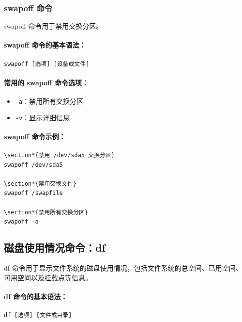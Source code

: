 \documentclass[12pt,UTF8]{ctexbook}
\begin{document}
\subsubsection{swapoff 命令}
swapoff 命令用于禁用交换分区。

\paragraph{swapoff 命令的基本语法：}
\begin{verbatim}
swapoff [选项] [设备或文件]
\end{verbatim}

\paragraph{常用的 swapoff 命令选项：}
\begin{itemize}
    \item \verb+-a+：禁用所有交换分区
    \item \verb+-v+：显示详细信息
\end{itemize}

\paragraph{swapoff 命令示例：}
\begin{verbatim}
\section*{禁用 /dev/sda5 交换分区}
swapoff /dev/sda5

\section*{禁用交换文件}
swapoff /swapfile

\section*{禁用所有交换分区}
swapoff -a
\end{verbatim}

\subsection{磁盘使用情况命令：df}
\label{df\_command}

df 命令用于显示文件系统的磁盘使用情况，包括文件系统的总空间、已用空间、可用空间以及挂载点等信息。

\paragraph{df 命令的基本语法：}
\begin{verbatim}
df [选项] [文件或目录]
\end{verbatim}
\end{document}
